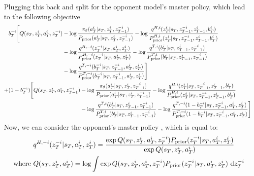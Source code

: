 Plugging this back and split for the opponent model's master policy, which lead to the following objective
\begin{equation}
\begin{aligned}
    &b_T^{-i}\begin{aligned}[t]
        \Bigg[Q(s_T, z^i_T, a^{i}_T, z^{-i}_T) &- \log\frac{\pi_\theta(a^i_T | s_T, z^i_T, z^{-i}_{T-1})}{P_{\text{prior}}(a^i_T | s_T, z^i_T, z^{-i}_{T-1})} - \log\frac{q^{H, i}(z^i_T | s_T, z^{-i}_{T-1}, z^i_{T-1}, b^i_T)}{P^{H, i}_{\text{prior}}(z^i_T | s_T, z^{-i}_{T-1}, z^i_{T-1}, b^i_T)} \\
        &- \log\frac{q^{H, -i}(z_T^{-i} | s_T, a^i_T, z^i_T)}{P^{H, -i}_{\text{prior}}(z_T^{-i} | s_T, a^i_T, z^i_T)} - \log\frac{q^{T,i}(b^i_T | s_T, z^i_{T-1}, z^{-i}_{T-1})}{P^{T,i}_{\text{prior}}(b^i_T | s_T, z^i_{T-1}, z^{-i}_{T-1})} \\
        &- \log\frac{q^{T,-i}(b^{-i}_T | s_T,  z^{-i}_{T-1}, a^i_T, z^i_T)}{P^{T,-i}_{\text{prior}}(b^{-i}_T | s_T,  z^{-i}_{T-1}, a^i_T, z^i_T) } \Bigg]
    \end{aligned} \\
    +&(1-b_T^{-i})\begin{aligned}[t]
        \Bigg[Q(s_T, z^i_T, a^{i}_T, z^{-i}_{T-1}) &- \log\frac{\pi_\theta(a^i_T | s_T, z^i_T, z^{-i}_{T-1})}{P_{\text{prior}}(a^i_T | s_T, z^i_T, z^{-i}_{T-1})} - \log\frac{q^{H, i}(z^i_T | s_T, z^{-i}_{T-1}, z^i_{T-1}, b^i_T)}{P^{H, i}_{\text{prior}}(z^i_T | s_T, z^{-i}_{T-1}, z^i_{T-1}, b^i_T)} \\
        &- \log\frac{q^{T,i}(b^i_T | s_T, z^i_{T-1}, z^{-i}_{T-1})}{P^{T,i}_{\text{prior}}(b^i_T | s_T, z^i_{T-1}, z^{-i}_{T-1})} - \log\frac{q^{T,-i}(1-b^{-i}_T | s_T,  z^{-i}_{T-1}, a^i_T, z^i_T)}{P^{T,-i}_{\text{prior}}(1-b^{-i}_T | s_T,  z^{-i}_{T-1}, a^i_T, z^i_T)} \Bigg]
    \end{aligned}
\end{aligned}
\end{equation}
Now, we can consider the opponent's master policy , which is equal to:
\begin{equation}
\begin{aligned}
    &q^{H, -i}(z_T^{-i} | s_T, a^i_T, z^i_T) = \frac{\exp Q(s_T, z^i_T, a^{i}_T, z^{-i}_T) P_{\text{prior}}(z_T^{-i} | s_T, a^i_T, z^i_T)}{\exp Q(s_T, z^i_T, a^{i}_T)} \\
    \text{ where }& Q(s_T, z^i_T, a^{i}_T) = \log \int \exp Q(s_T, z^i_T, a^{i}_T, z^{-i}_T) P_{\text{prior}}(z_T^{-i} | s_T, a^i_T, z^i_T) \ \mathrm{d} z^{-i}_T
\end{aligned}
\end{equation}
